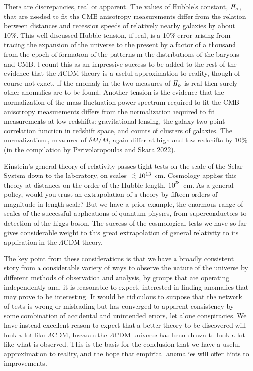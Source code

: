 \documentclass[fleqn,12pt]{article}
\def\lap{\lower.5ex\hbox{$\; \buildrel < \over \sim \;$}}
\begin{document}
There are discrepancies, real or apparent. The values of Hubble's constant, $H_{\rm o}$, that are needed to fit the CMB anisotropy measurements differ from the relation between distances and recession speeds of relatively nearby galaxies by about 10\%. This well-discussed Hubble tension, if real, is a 10\% error arising from tracing the expansion of the universe to the present by a factor of a thousand from the epoch of formation of the patterns in the distributions of the baryons and CMB. I count this as an impressive success to be added to the rest of the evidence that the $\Lambda$CDM theory is a useful approximation to reality, though of course not exact. If the anomaly in the two measures of $H_{\rm o}$ is real then surely other anomalies are to be found. Another tension is the evidence that  the normalization of the mass fluctuation power spectrum required to fit the CMB anisotropy measurements differs from the normalization required to fit measurements at low redshifts: gravitational lensing, the galaxy two-point correlation function in redshift space, and counts of clusters of galaxies. The normalizations, measures of $\delta M/M$, again differ at high and low redshifts by 10\% (in the compilation by Perivolaropoulos and Skara 2022). 
   
Einstein's general theory of relativity passes tight tests on the scale of the Solar System down to the laboratory, on scales  $\lap 10^{13}$~cm. Cosmology applies this theory at distances on the order of the Hubble length, $10^{28}$~cm. As a general policy, would you trust an extrapolation of a theory by fifteen orders of magnitude in length scale? But we have a prior example, the enormous range of scales of the successful applications of quantum physics, from superconductors to detection of the higgs boson. The success of the cosmological tests we have so far gives considerable weight to this great extrapolation of general relativity to its application in the $\Lambda$CDM theory. 

The key point from these considerations is that we have a broadly consistent story from a considerable variety of ways to observe the nature of the universe by different methods of observation and analysis, by groups that are operating independently and, it is reasonable to expect, interested in finding anomalies that may prove to be interesting. It would be ridiculous to suppose that the network of tests is wrong or misleading but has converged to apparent consistency by some combination of accidental and unintended errors, let alone conspiracies. We have instead excellent reason to expect that a better theory to be discovered will look a lot like $\Lambda$CDM, because the $\Lambda$CDM universe has been shown to look a lot like what is observed. This is the basis for the conclusion that we have a useful approximation to reality, and the hope that empirical anomalies will offer hints to improvements.
\end{document}
